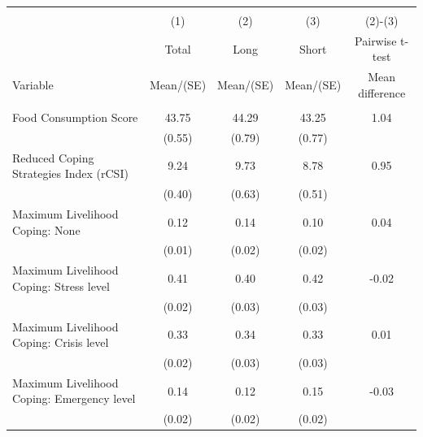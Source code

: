 
\begin{tabular}{@{\extracolsep{5pt}}lcccc}
\\[-1.8ex]\hline \hline \\[-1.8ex]
 & \multicolumn{1}{c}{(1)}  & \multicolumn{1}{c}{(2)}  & \multicolumn{1}{c}{(3)}  & \multicolumn{1}{c}{(2)-(3)} \\
 & \multicolumn{1}{c}{Total}  & \multicolumn{1}{c}{Long}  & \multicolumn{1}{c}{Short}  & \multicolumn{1}{c}{Pairwise t-test}  \\
Variable & Mean/(SE) & Mean/(SE) & Mean/(SE) & Mean difference \\ \hline \\[-1.8ex] 
Food Consumption Score   & 43.75    & 44.29    & 43.25    & 1.04   \\
 & (0.55)  & (0.79)  & (0.77)  &  \\ [1ex]
Reduced Coping Strategies Index (rCSI)   & 9.24    & 9.73    & 8.78    & 0.95   \\
 & (0.40)  & (0.63)  & (0.51)  &  \\ [1ex]
Maximum Livelihood Coping: None   & 0.12    & 0.14    & 0.10    & 0.04   \\
 & (0.01)  & (0.02)  & (0.02)  &  \\ [1ex]
Maximum Livelihood Coping: Stress level   & 0.41    & 0.40    & 0.42    & -0.02   \\
 & (0.02)  & (0.03)  & (0.03)  &  \\ [1ex]
Maximum Livelihood Coping: Crisis level   & 0.33    & 0.34    & 0.33    & 0.01   \\
 & (0.02)  & (0.03)  & (0.03)  &  \\ [1ex]
Maximum Livelihood Coping: Emergency level   & 0.14    & 0.12    & 0.15    & -0.03   \\
 & (0.02)  & (0.02)  & (0.02)  &  \\ [1ex]

\end{tabular}
